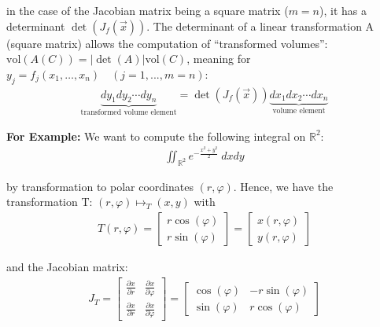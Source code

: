 in the case of the Jacobian matrix being a square matrix ($m=n$), it has a determinant $\det(J_f(\vec{x}))$.
The determinant of a linear transformation A (square matrix) allows the computation of ``transformed volumes'':
$\mathrm{vol}(A(C))=|\det(A)|\mathrm{vol}(C)$, meaning for $y_j = f_j(x_1,\ldots,x_n)\quad(j=1,...,m=n)$:
\begin{align*}
    \underbrace{dy_1dy_2\cdots dy_n}_\text{transformed volume element} = \det(J_f(\vec{x}))
    \underbrace{dx_1dx_2\cdots dx_n}_\text{volume element}
\end{align*}


\textbf{For Example:} We want to compute the following integral on $\mathbb{R}^2$:
\begin{align*}
	\iint_{\mathbb{R}^2}e^{-\frac{x^2+y^2}{2}}\ dxdy
\end{align*}

by transformation to polar coordinates $(r,\varphi)$.
Hence, we have the transformation T: $(r,\varphi) \mapsto_T (x,y)$ with
\begin{align*}
	T(r,\varphi) = \begin{bmatrix}
		r\cos(\varphi) \\
		r\sin(\varphi)
	\end{bmatrix}
	=
	\begin{bmatrix}
		x(r, \varphi) \\
		y(r, \varphi)
	\end{bmatrix}
\end{align*}

and the Jacobian matrix:
\begin{align*}
	J_T =
	\begin{bmatrix}
		\frac{\partial x}{\partial r} & \frac{\partial x}{\partial \varphi} \\
		\frac{\partial x}{\partial r} & \frac{\partial x}{\partial \varphi}
	\end{bmatrix}
	=
	\begin{bmatrix}
		\cos(\varphi) & -r\sin(\varphi) \\
		\sin(\varphi) & r\cos(\varphi)
	\end{bmatrix}
\end{align*}

